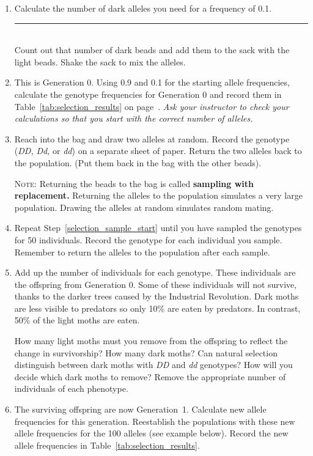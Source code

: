 \documentclass[12pt]{exam}
\newcommand{\allele}[1]{\textit{#1}}
\begin{document}
\begin{questions}
\begin{enumerate}
	\item Calculate the number of dark alleles you need for a frequency of 0.1. \hfill \rule{0.5in}{0.4pt} \\ Count out that number of dark beads and add them to the sack with the light beads. Shake the sack to mix the alleles.
	
	\item This is Generation 0. Using 0.9 and 0.1 for the starting allele frequencies, calculate the genotype frequencies for Generation 0 and record them in Table~\ref{tab:selection_results} on page~\pageref{tab:selection_results}. \emph{Ask your instructor to check your calculations so that you start with the correct number of alleles.}
	
	\item \label{selection_sample_start} Reach into the bag and draw two alleles at random. Record the genotype (\allele{DD,} \allele{Dd,} or \allele{dd}) on a separate sheet of paper. Return the two alleles back to the population. (Put them back in the bag with the other beads).
	
	\textsc{Note:} Returning the beads to the bag is called \textbf{sampling with replacement.} Returning the alleles to the population simulates a very large population. Drawing the alleles at random simulates random mating.
	
	\item Repeat Step~\ref{selection_sample_start} until you have sampled the genotypes for 50 individuals. Record the genotype for each individual you sample. Remember to return the alleles to the population after each sample. 
	
	\item Add up the number of individuals for each genotype. These individuals are the offspring from Generation 0. Some of these individuals will not survive, thanks to the darker trees caused by the Industrial Revolution. Dark moths are less visible to predators so only 10\% are eaten by predators. In contrast, 50\% of the light moths are eaten. 
	
	How many light moths must you remove from the offspring to reflect the change in survivorship? How many dark moths? Can natural selection distinguish between dark moths with \allele{DD} and \allele{dd} genotypes? How will you decide which dark moths to remove? Remove the appropriate number of individuals of each phenotype.
	
	\item \label{selection_sample_stop} The surviving offspring are now Generation~1. Calculate new allele frequencies for this generation. Reestablish the populations with these new allele frequencies for the 100 alleles (see example below). Record the new allele frequencies in Table~\ref{tab:selection_results}.
	

\end{enumerate}
\end{questions}
\end{document}
